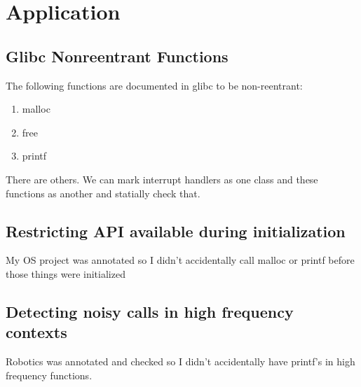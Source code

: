 \chapter{Application}\label{sec:application}

\section{Glibc Nonreentrant Functions}

The following functions are documented in glibc to be non-reentrant:

\begin{enumerate}
    \item malloc
    \item free
    \item printf
\end{enumerate}

There are others.  We can mark interrupt handlers as one class and these functions as another and statially check that.

\section{Restricting API available during initialization}

My OS project was annotated so I didn't accidentally call malloc or printf before those things were initialized

\section{Detecting noisy calls in high frequency contexts}

Robotics was annotated and checked so I didn't accidentally have printf's in high frequency functions.
